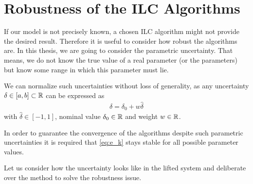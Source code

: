 \chapter{Robustness of the ILC Algorithms}
\label{ch:Robustness}
If our model is not precisely known, a chosen ILC algorithm might not provide the desired result. 
Therefore it is useful to consider how robust the algorithms are. 
In this thesis, we are going to consider the parametric uncertainty. That means, we do not know the true value of a real parameter (or the parameters) but know some range in which this parameter must lie. 

We can normalize such uncertainties without loss of generality, as any uncertainty $\delta \in [a,b] \subset {\mathbb{R}}$ can be expressed as 
\begin{align}
\label{eq:rob:del=del0+...}
\delta = \delta_0 + w \hat{\delta}
\end{align}
with $\hat{\delta} \in [-1,1]$, nominal value $\delta_0 \in {\mathbb{R}}$ and weight $w\in {\mathbb{R}}$. 

%

In order to guarantee the convergence of the algorithms despite such parametric uncertainties it is required that \eqref{eq:e_k}  stays stable for all possible parameter values.

Let us consider how the uncertainty looks like in the lifted system and deliberate over the method to solve the robustness issue.





